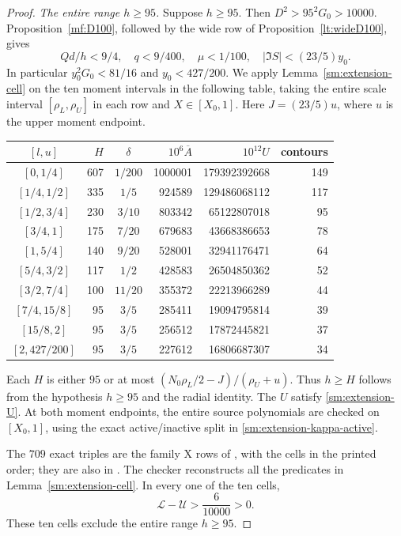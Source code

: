 \begin{proof}
\smallskip
\noindent\emph{The entire range $h\ge95$.}
Suppose $h\ge95$. Then $D^2>95^2G_0>10000$.
Proposition~\ref{mf:D100}, followed by the wide row of
Proposition~\ref{lt:wideD100}, gives
\[
 Qd/h<9/4,\quad q<9/400,\quad \mu<1/100,\quad
 |\Im S|<(23/5)y_0.
\]
In particular $y_0^2G_0<81/16$ and $y_0<427/200$.
We apply Lemma~\ref{sm:extension-cell} on the ten moment
intervals in the following table, taking the entire scale
interval $[\rho_L,\rho_U]$ in each row and $X\in[X_0,1]$.
Here $J=(23/5)u$, where $u$ is the upper moment endpoint.
\begin{center}\small
\begin{tabular}{c|rcrrr}
\toprule
$[l,u]$&$H$&$\delta$&$10^6\overline A$&$10^{12}U$&contours\\
\midrule
$[0,1/4]$&607&$1/200$&1000001&179392392668&149\\
$[1/4,1/2]$&335&$1/5$&924589&129486068112&117\\
$[1/2,3/4]$&230&$3/10$&803342&65122807018&95\\
$[3/4,1]$&175&$7/20$&679683&43668386653&78\\
$[1,5/4]$&140&$9/20$&528001&32941176471&64\\
$[5/4,3/2]$&117&$1/2$&428583&26504850362&52\\
$[3/2,7/4]$&100&$11/20$&355372&22213966289&44\\
$[7/4,15/8]$&95&$3/5$&285411&19094795814&39\\
$[15/8,2]$&95&$3/5$&256512&17872445821&37\\
$[2,427/200]$&95&$3/5$&227612&16806687307&34\\
\bottomrule
\end{tabular}
\end{center}
Each $H$ is either $95$ or at most
$(N_0\rho_L/2-J)/(\rho_U+u)$. Thus $h\ge H$ follows from
the hypothesis $h\ge95$ and the radial identity.
The $U$ satisfy \eqref{sm:extension-U}.
At both moment endpoints, the entire source polynomials
are checked on $[X_0,1]$, using the exact active/inactive
split in \eqref{sm:extension-kappa-active}.

The $709$ exact triples are the family \textup{X} rows of
,
with the cells in the printed order; they are also in
.
The checker 
reconstructs all the predicates in
Lemma~\ref{sm:extension-cell}. In every one of the ten cells,
\[
 \mathcal L-\mathcal U>\frac6{10000}>0.
\]
These ten cells exclude the entire range $h\ge95$.


\end{proof}

